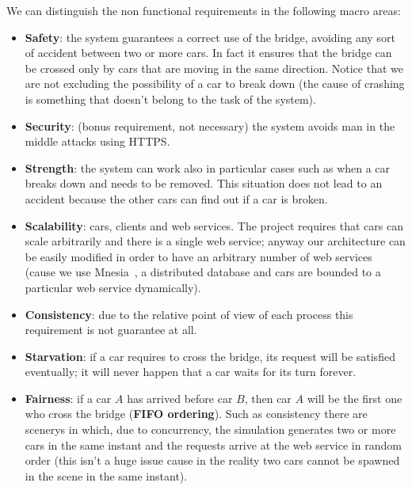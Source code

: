We can distinguish the non functional requirements in the following macro areas:
\begin{itemize}
    \item \textbf{Safety}: the system guarantees a correct use of the bridge, avoiding 
        any sort of accident between two or more cars. 
        In fact it ensures that the bridge can be crossed only by cars that are moving 
        in the same direction. 
        Notice that we are not excluding the possibility of a car to break down 
        (the cause of crashing is something that doesn't belong to the task of the system).
    \item \textbf{Security}: (bonus requirement, not necessary) 
        the system avoids man in the middle attacks using HTTPS.
    \item \textbf{Strength}: the system can work also in particular cases such as 
        when a car breaks down and needs to be removed. 
        This situation does not lead to an accident because the other cars can find out 
        if a car is broken.
    \item \textbf{Scalability}: cars, clients and web services. The project requires that
        cars can scale arbitrarily and there is a single web service; 
        anyway our architecture can be easily modified in order to have an arbitrary number 
        of web services (cause we use Mnesia~\cite{1}, a distributed database and cars are 
        bounded to a particular web service dynamically).
    \item \textbf{Consistency}: due to the relative point of view of each process this 
    requirement is not guarantee at all.
    \item \textbf{Starvation}: if a car requires to cross the bridge, 
        its request will be satisfied eventually; 
    it will never happen that a car waits for its turn forever.
    \item \textbf{Fairness}: if a car $A$ has arrived before car $B$, 
        then car $A$ will be the first one who cross the bridge (\textbf{FIFO ordering}).
        Such as consistency there are scenerys in which, due to concurrency, the simulation 
        generates two or more cars in the same instant and the requests arrive 
        at the web service in random order (this isn't a huge issue cause in the reality 
        two cars cannot be spawned in the scene in the same instant).
\end{itemize}